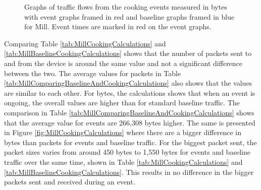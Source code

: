 \begin{figure}[H]
\begin{subfigure}[b]{0.47\textwidth}
    \end{subfigure}
        \begin{subfigure}[b]{0.47\textwidth}
        \centering
    \end{subfigure}
    \begin{subfigure}[b]{0.47\textwidth}
        \centering
    \end{subfigure}
    \begin{subfigure}[b]{0.47\textwidth}
        \centering
    \end{subfigure}
    \hspace{0.6cm}
    \begin{subfigure}[b]{0.47\textwidth}
    \centering
        \end{subfigure}
    \caption{Graphs of traffic flows from the cooking events measured in bytes with event graphs framed in red and baseline graphs framed in blue for Mill. Event times are marked in red on the event graphs.} 
    \label{fig:MillCookingBytes2}
\end{figure}

Comparing Table \ref{tab:MillCookingCalculations} and \ref{tab:MillBaselineCookingCalculations} shows that the number of packets sent to and from the device is around the same value and not a significant difference between the two. The average values for packets in Table \ref{tab:MillComparingBaselineAndCookingCalculations} also shows that the values are similar to each other. For bytes, the calculations shows that when an event is ongoing, the overall values are higher than for standard baseline traffic. The comparison in Table \ref{tab:MillComparingBaselineAndCookingCalculations} shows that the average value for events are 266,308 bytes higher. The same is presented in Figure \ref{fig:MillCookingCalculations} where there are a bigger difference in bytes than packets for events and baseline traffic. For the biggest packet sent, the packet sizes varies from around 450 bytes to 1,550 bytes for events and baseline traffic over the same time, shown in Table \ref{tab:MillCookingCalculations} and \ref{tab:MillBaselineCookingCalculations}. This results in no difference in the bigger packets sent and received during an event. 

